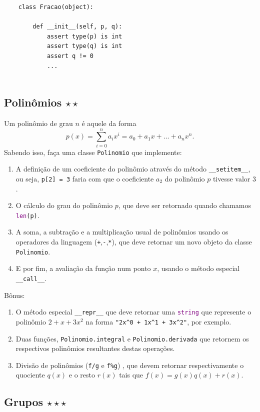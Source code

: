\documentclass[12pt]{article}
\newcommand{\mono}[1]{\texttt{#1}}
\newcommand{\type}[1]{\textcolor{purple}{\mono{#1}}}
\newcommand{\spm}[1]{\mono{\_\_#1\_\_}}
\begin{document}
	\begin{verbatim}
	class Fracao(object):
	    
	    def __init__(self, p, q):
	        assert type(p) is int
	        assert type(q) is int
	        assert q != 0
	        ...
	        
	\end{verbatim}
	
	\subsection{Polinômios \cite{esperanca} $\star\star$}
	Um polinômio de grau $n$ é aquele da forma
	\[p(x) = \sum_{i=0}^{n} a_{i} x^{i}=a_{0} + a_{1}x + \dots + a_{n} x^{n}.\]
	Sabendo isso, faça uma classe \mono{Polinomio} que implemente:
	\begin{enumerate}
		\item A definição de um coeficiente do polinômio através do método \spm{setitem}, ou seja, \mono{p[2] = 3} faria com que o coeficiente $a_{2}$ do polinômio $p$ tivesse valor $3$.
		
		\item O cálculo do grau do polinômio $p$, que deve ser retornado quando chamamos \type{len}\mono{(p)}.
		
		\item A soma, a subtração e a multiplicação usual de polinômios usando os operadores da linguagem (\mono{+},\mono{-},\mono{*}), que deve retornar um novo objeto da classe \mono{Polinomio}.
		
		\item E por fim, a avaliação da função num ponto $x$, usando o método especial \spm{call}.
	\end{enumerate}
	Bônus:
	\begin{enumerate}
		\item O método especial \spm{repr} que deve retornar uma \type{string} que represente o polinômio $2 + x + 3x^{2}$ na forma \mono{"2x\^{}0 + 1x\^{}1 + 3x\^{}2"}, por exemplo.
		\item Duas funções, \mono{Polinomio.integral} e \mono{Polinomio.derivada} que retornem os respectivos polinômios resultantes destas operações.
		
		\item Divisão de polinômios (\mono{f/g} e \mono{f\%g}) , que devem retornar respectivamente o quociente $q(x)$ e o resto $r(x)$ tais que $f(x) = g(x) q(x) + r(x)$.
	\end{enumerate}
	
	\subsection{Grupos $\star\star\star$}
	
\end{document}
